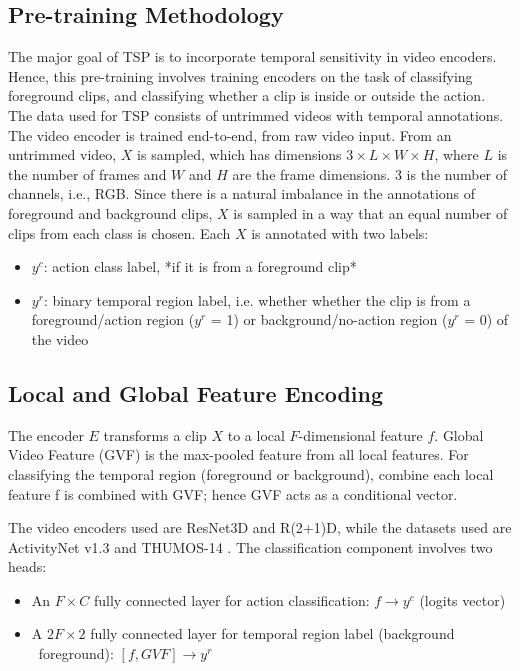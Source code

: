 \subsection{Pre-training Methodology}
The major goal of TSP is to incorporate temporal sensitivity in video encoders. Hence, this 
pre-training involves training encoders on the task of classifying foreground clips, and 
classifying whether a clip is inside or outside the action. The data used for TSP consists 
of untrimmed videos with temporal annotations. The video encoder is trained end-to-end, from 
raw video input. From an untrimmed video, $X$ is sampled, which has dimensions $3 \times L 
\times W \times H$, where $L$ is the number of frames and $W$ and $H$ are the frame 
dimensions. 3 is the number of channels, i.e., RGB. Since there is a natural imbalance in 
the annotations of foreground and background clips, $X$ is sampled in a way that an equal 
number of clips from each class is chosen. Each $X$ is annotated with two labels:
\begin{itemize}
\item $y^c$: action class label, *if it is from a foreground clip*
\item $y^r$: binary temporal region label, i.e. whether whether the clip is from a 
foreground/action region ($y^r$ = 1) or background/no-action region ($y^r$ = 0) of the video
\end{itemize}

\subsection{Local and Global Feature Encoding}
The encoder $E$ transforms a clip $X$ to a local $F$-dimensional feature $f$. Global Video 
Feature (GVF) is the max-pooled feature from all local features. For classifying the 
temporal region (foreground or background), combine each local feature f is combined with 
GVF; hence GVF acts as a conditional vector.

\par The video encoders used are ResNet3D and R(2+1)D, while the datasets used are 
ActivityNet v1.3 and THUMOS-14 \cite{thumos-14}. The classification component involves two  
heads:
\begin{itemize}
\item An $F \times C$ fully connected layer for action classification: $f \rightarrow y^c$  (logits vector)
\item A $2F \times 2$ fully connected layer for temporal region label (background \ foreground): $[f, GVF] \rightarrow y^r$
\end{itemize}

